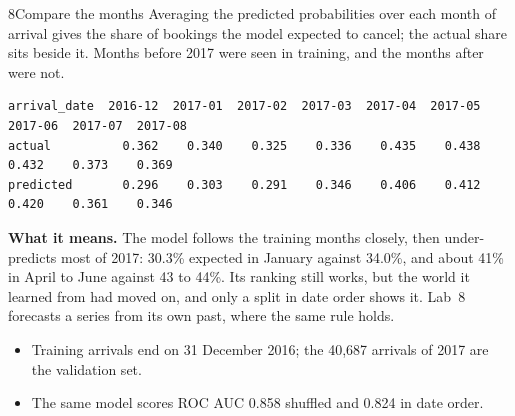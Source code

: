 \begin{labquestion}{8}{Compare the months}
Averaging the predicted probabilities over each month of arrival gives the share of bookings the model expected to cancel; the actual share sits beside it. Months before 2017 were seen in training, and the months after were not.
\end{labquestion}
\begin{labanswer}

\begin{refoutput}
\begin{lstlisting}[style=utpterminal]
arrival_date  2016-12  2017-01  2017-02  2017-03  2017-04  2017-05  2017-06  2017-07  2017-08
actual          0.362    0.340    0.325    0.336    0.435    0.438    0.432    0.373    0.369
predicted       0.296    0.303    0.291    0.346    0.406    0.412    0.420    0.361    0.346
\end{lstlisting}
\end{refoutput}

\textbf{What it means.} The model follows the training months closely, then under-predicts most of 2017: 30.3\% expected in January against 34.0\%, and about 41\% in April to June against 43 to 44\%. Its ranking still works, but the world it learned from had moved on, and only a split in date order shows it. Lab~8 forecasts a series from its own past, where the same rule holds.
\end{labanswer}

\begin{labcheckpoint}
\begin{itemize}[leftmargin=1.2em,itemsep=2pt,topsep=1pt]
  \item Training arrivals end on 31 December 2016; the 40,687 arrivals of 2017 are the validation set.
  \item The same model scores ROC AUC 0.858 shuffled and 0.824 in date order.
\end{itemize}
\end{labcheckpoint}


